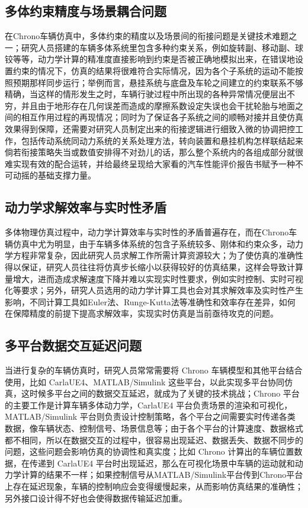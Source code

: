 \subsection{多体约束精度与场景耦合问题}

在Chrono车辆仿真中，多体约束的精度以及场景间的衔接问题是关键技术难题之一；研究人员搭建的车辆多体系统里包含多种约束关系，例如旋转副、移动副、球铰等等，动力学计算的精准度直接影响到约束是否被正确地模拟出来，在错误地设置约束的情况下，仿真的结果将很难符合实际情况，因为各个子系统的运动不能按照预期那样同步运行；举例而言，悬挂系统与底盘及车轮之间建立的约束联系不够精确，当这样的情形发生之时，车辆行驶过程中所出现的各种异常情况便层出不穷，并且由于地形存在几何误差而造成的摩擦系数设定失误也会干扰轮胎与地面之间的相互作用过程的再现情况；同时为了保证各子系统之间的顺畅对接并且使仿真效果得到保障，还需要对研究人员制定出来的衔接逻辑进行细致入微的协调把控工作，包括传动系统同动力系统的关系处理方法，转向装置和悬挂机构怎样联结起来倘若衔接策略失当或数值安排得不对劲儿的话，那么整个系统内的各组成部分就很难实现有效的配合运转，并给最终呈现给大家看的汽车性能评价报告书赋予一种不可动摇的基础支撑力量。

\subsection{动力学求解效率与实时性矛盾}

多体物理仿真过程中，动力学计算效率与实时性的矛盾普遍存在，而在Chrono车辆仿真中尤为明显，由于车辆多体系统的包含子系统较多、刚体和约束众多，动力学方程非常复杂，因此研究人员求解工作所需计算资源较大；为了使仿真的准确性得以保证，研究人员往往将仿真步长缩小以获得较好的仿真结果，这样会导致计算量增大，进而造成求解速度下降并难以实现实时性要求，例如实时控制、实时可视化等要求；另外，研究人员选用的动力学计算工具也会对其求解效率及实时性产生影响，不同计算工具如Euler法、Runge-Kutta法等准确性和效率存在差异，如何在保障精度的前提下提高求解效率\cite{wang2023crash}，实现实时仿真是当前亟待攻克的问题。

\subsection{多平台数据交互延迟问题}

当进行复杂的车辆仿真时，研究人员常常需要将 Chrono 车辆模型和其他平台结合使用，比如 CarlaUE4、MATLAB/Simulink 这些平台，以此实现多平台协同仿真，这时候多平台之间的数据交互延迟，就成为了关键的技术挑战；Chrono 平台的主要工作是计算车辆多体动力学，CarlaUE4 平台负责场景的渲染和可视化，MATLAB/Simulink 平台则负责设计控制策略，各个平台之间需要实时传递各类数据，像车辆状态、控制信号、场景信息等；由于各个平台的计算速度、数据格式都不相同，所以在数据交互的过程中，很容易出现延迟、数据丢失、数据不同步的问题，这些问题会影响仿真的协调性和真实度；比如 Chrono 计算出的车辆位置数据，在传递到 CarlaUE4 平台时出现延迟，那么在可视化场景中车辆的运动就和动力学计算的结果不一样；如果控制信号从MATLAB/Simulink平台传到Chrono平台上存在延迟现象，车辆的控制响应会变得缓慢起来，从而影响仿真结果的准确性；另外接口设计得不好也会使得数据传输延迟加重\cite{bai2024mixed}。

